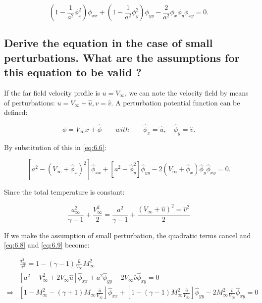 \documentclass[british,french,11pt, a4paper, openany]{article}
\begin{document}
\begin{equation}
\left( 1-\frac{1}{a^2} \phi^2_x \right) \phi _{xx} + \left( 1-\frac{1}{a^2 }\phi^2_y \right) \phi _{yy} - \frac{2}{a^2} \phi_x \phi_y \phi _{xy} = 0.
\label{eq:6.6}
\end{equation}	


\subsection{Derive the equation in the case of small perturbations. What are the assumptions
	for this equation to be valid ?}

If the far field velocity profile is $u= V_\infty$, we can note the velocity field by means of perturbations: $u = V_\infty + \hat{u}, v = \hat{v}$. A perturbation potential function can be defined: 

\begin{equation}
\phi = V_\infty x + \hat{\phi}\qquad with \qquad \hat{\phi} _x = \hat{u}, \quad \hat{\phi}_y = \hat{v}. 
\end{equation}

By substitution of this in \eqref{eq:6.6}:

\begin{equation}
\left[ a^2- (V_\infty + \hat{\phi} _x )^2 \right] \hat{\phi} _{xx} + \left[ a^2-\hat{\phi}_y ^2 \right] \hat{\phi} _{yy} - 2 (V_\infty + \hat{\phi} _x) \hat{\phi}_y \hat{\phi} _{xy} = 0.
\label{eq:6.8}
\end{equation}

Since the total temperature is constant:

\begin{equation}
\frac{a^2_\infty}{\gamma -1} + \frac{V_\infty ^2}{2} = \frac{a^2}{\gamma -1} + \frac{(V_\infty + \hat{u}) ^2 = \hat{v}^2}{2} 
\label{eq:6.9}
\end{equation}

If we make the assumption of small perturbation, the quadratic terms cancel and \eqref{eq:6.8} and \eqref{eq:6.9} become:

\begin{equation}
\begin{aligned}
&\frac{a^2_\infty}{a^2} = 1 - (\gamma -1) \frac{\hat{u}}{V_\infty} M^2_\infty\\
&\left[ a^2- V^2_\infty + 2V_\infty \hat{u}  \right] \hat{\phi} _{xx} + a^2 \hat{\phi} _{yy} - 2 V_\infty \hat{v} \hat{\phi} _{xy} = 0 \\ 
\Rightarrow 
&\left[ 1- M_\infty^2 - (\gamma + 1) M_\infty \frac{\hat{u}}{V_\infty} \right] \hat{\phi} _{xx} + \left[ 1 - (\gamma -1 )M_\infty ^2\frac{\hat{u}}{V_\infty} \right] \hat{\phi} _{yy} - 2 M^2_\infty \frac{\hat{v}}{V_\infty} \hat{\phi} _{xy} = 0 
\end{aligned}
\end{equation}
\end{document}
